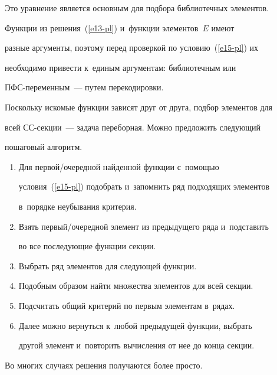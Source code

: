    Это уравнение является основным для подбора библиотечных элементов.


   


   Функции из решения~(\ref{e13-pl}) и~функции элементов~$E$ имеют 


разные аргументы, поэтому перед проверкой по условию~(\ref{e15-pl}) их 


необходимо привести к~единым аргументам: библиотечным или  


ПФС-пе\-ре\-мен\-ным~--- путем перекодировки.


   


   Поскольку искомые функции зависят друг от друга, подбор элементов для 


всей СС-сек\-ции~--- задача переборная. Можно предложить следующий 


пошаговый алгоритм.


   \begin{enumerate}[1.]


   \item Для первой/очередной найденной функции с~помощью 


условия~(\ref{e15-pl}) подобрать и~запомнить ряд подходящих элементов 


в~порядке неубывания критерия.


   \item Взять первый/очередной элемент из предыдущего ряда и~подставить 


во все последующие функции секции.


   \item Выбрать ряд элементов для следующей функции.


   \item Подобным образом найти множества элементов для всей секции.


   \item Подсчитать общий критерий по первым элементам в~рядах.


   \item Далее можно вернуться к~любой предыдущей функции, выбрать 


другой элемент и~повторить вычисления от нее до конца секции.


   \end{enumerate}


   


   Во многих случаях решения получаются более просто.


